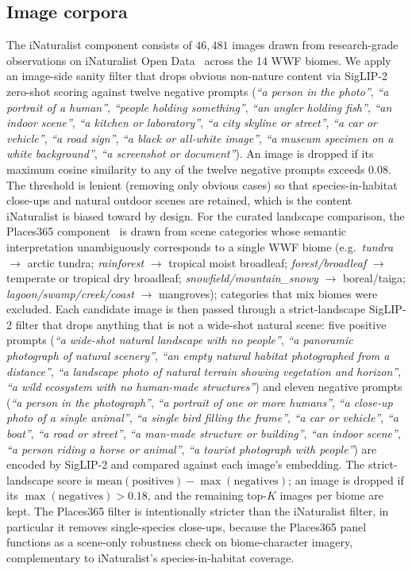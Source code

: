 \documentclass[11pt,a4paper]{article}
\begin{document}
\subsection*{Image corpora}

The iNaturalist component consists of $46{,}481$ images drawn from
research-grade observations on iNaturalist Open
Data~\citep{inaturalist2024} across the 14 WWF biomes. We apply an
image-side sanity filter that drops obvious non-nature content via
SigLIP-2 zero-shot scoring against twelve negative prompts
(\emph{``a person in the photo''}, \emph{``a portrait of a human''},
\emph{``people holding something''}, \emph{``an angler holding
fish''}, \emph{``an indoor scene''}, \emph{``a kitchen or
laboratory''}, \emph{``a city skyline or street''}, \emph{``a car
or vehicle''}, \emph{``a road sign''}, \emph{``a black or
all-white image''}, \emph{``a museum specimen on a white
background''}, \emph{``a screenshot or document''}). An image is
dropped if its maximum cosine similarity to any of the twelve
negative prompts exceeds $0.08$. The threshold is lenient
(removing only obvious cases) so that species-in-habitat
close-ups and natural outdoor scenes are retained, which is the
content iNaturalist is biased toward by design. For the curated landscape comparison, the Places365
component~\citep{zhou2018places} is drawn from scene categories
whose semantic interpretation unambiguously corresponds to a
single WWF biome (e.g.\ \emph{tundra} $\to$ arctic tundra;
\emph{rainforest} $\to$ tropical moist broadleaf;
\emph{forest/broadleaf} $\to$ temperate or tropical dry
broadleaf; \emph{snowfield/mountain\_snowy} $\to$ boreal/taiga;
\emph{lagoon/swamp/creek/coast} $\to$ mangroves); categories that
mix biomes were excluded. Each candidate image is then passed
through a strict-landscape SigLIP-2 filter that drops anything
that is not a wide-shot natural scene: five positive prompts
(\emph{``a wide-shot natural landscape with no people''},
\emph{``a panoramic photograph of natural scenery''}, \emph{``an
empty natural habitat photographed from a distance''}, \emph{``a
landscape photo of natural terrain showing vegetation and
horizon''}, \emph{``a wild ecosystem with no human-made
structures''}) and eleven negative prompts (\emph{``a person in
the photograph''}, \emph{``a portrait of one or more humans''},
\emph{``a close-up photo of a single animal''}, \emph{``a single
bird filling the frame''}, \emph{``a car or vehicle''}, \emph{``a
boat''}, \emph{``a road or street''}, \emph{``a man-made structure
or building''}, \emph{``an indoor scene''}, \emph{``a person
riding a horse or animal''}, \emph{``a tourist photograph with
people''}) are encoded by SigLIP-2 and compared against each
image's embedding. The strict-landscape score is
$\mathrm{mean}(\text{positives}) - \max(\text{negatives})$; an
image is dropped if its $\max(\text{negatives}) > 0.18$, and the
remaining top-$K$ images per biome are kept. The Places365 filter
is intentionally stricter than the iNaturalist filter, in
particular it removes single-species close-ups, because the
Places365 panel functions as a scene-only robustness check on
biome-character imagery, complementary to iNaturalist's
species-in-habitat coverage.
\end{document}
